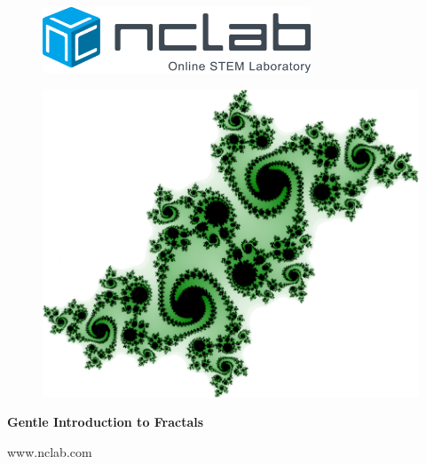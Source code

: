 \documentclass{article}
\begin{document}
\large

\vbox{}
\begin{figure}[!ht]
\includegraphics[width=8cm]{img/logo.png}
\vspace{6mm}
\end{figure}

\begin{figure}[!ht]
\begin{center}
\includegraphics[width=16cm]{img/fractals-frontpage.png}
\vspace{8mm}
\end{center}
\end{figure}

\centerline{\Huge \bf Gentle Introduction to Fractals}

\vfill

\centerline{\Large www.nclab.com}

\newpage




\section*{}
%
\end{document}
